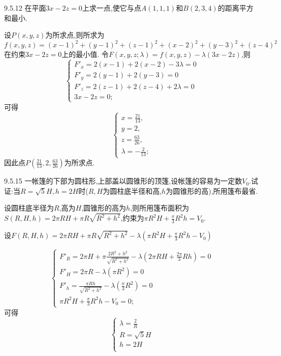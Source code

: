 \begin{exercise}{9.5.12}
    在平面$3x-2z=0$上求一点,使它与点$A(1,1,1)$和$B(2,3,4)$的距离平方和最小.
\end{exercise}
\begin{solution}
    设$P(x,y,z)$为所求点,则所求为$f(x,y,z)=(x-1)^2+(y-1)^2+(z-1)^2+(x-2)^2+(y-3)^2+(z-4)^2$在约束$3x-2z=0$上的最小值.
    令$F(x,y,z;\lambda)=f(x,y,z)-\lambda(3x-2z)$,则$$\begin{cases}
        F'_x=2(x-1)+2(x-2)-3\lambda=0\\
        F'_y=2(y-1)+2(y-3)=0\\
        F'_z=2(z-1)+2(z-4)+2\lambda=0\\
        3x-2z=0;
    \end{cases}$$
    可得$$\begin{cases}
        x=\frac{21}{13},\\
        y=2,\\
        z=\frac{63}{26},\\
        \lambda=-\frac{2}{13};
    \end{cases}$$
    因此点$P(\frac{21}{13},2,\frac{63}{26})$为所求点.
\end{solution}

\begin{exercise}{9.5.15}
    一帐篷的下部为圆柱形,上部盖以圆锥形的顶篷,设帐篷的容易为一定数$V_0$.试证:当$R=\sqrt{5}H,h=2H$时($R,H$为圆柱底半径和高,$h$为圆锥形的高),所用篷布最省.
\end{exercise}
\begin{solution}
    设圆柱底半径为$R$,高为$H$,圆锥形的高为$h$,则所用篷布面积为$S(R,H,h)=2\pi R H +\pi R \sqrt{R^2+h^2}$,约束为$\pi R^2 H+\frac{\pi}{3}R^2h=V_0$.
    
    设$F(R,H,h)=2\pi R H +\pi R \sqrt{R^2+h^2}-\lambda(\pi R^2 H+\frac{\pi}{3}R^2h-V_0)$
    
    $$\begin{cases}
        F'_R=2\pi H+\pi \frac{2R^2+h^2}{\sqrt{R^2+h^2}}-\lambda(2\pi RH+\frac{2\pi}{3}Rh)=0\\
        F'_H=2\pi R-\lambda(\pi R^2)=0\\
        F'_h=\frac{\pi Rh}{\sqrt{R^2+h^2}}-\lambda(\frac{\pi}{3}R^2)=0\\
        \pi R^2 H+\frac{\pi}{3}R^2h-V_0=0;
    \end{cases}$$
    可得$$\begin{cases}
        \lambda=\frac{2}{R}\\
        R=\sqrt{5}H\\
        h=2H\\
    \end{cases}$$
\end{solution}


